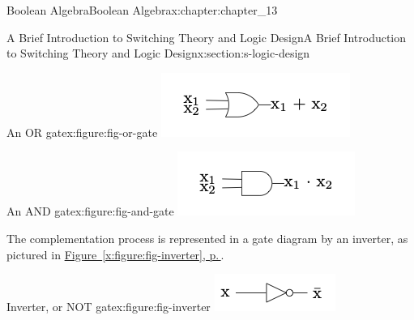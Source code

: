 \documentclass[twoside,10pt,]{book}
\newcommand{\xreffont}{\relax}
\numberwithin{equation}{section}
\begin{document}
\begin{chapterptx}{Boolean Algebra}{}{Boolean Algebra}{}{}{x:chapter:chapter_13}
\begin{sectionptx}{A Brief Introduction to Switching Theory and Logic Design}{}{A Brief Introduction to Switching Theory and Logic Design}{}{}{x:section:s-logic-design}
\begin{sidebyside}{2}{0}{0}{0}%
\begin{sbspanel}{0.5}%
\begin{figureptx}{An OR gate}{x:figure:fig-or-gate}{}%
\includegraphics[width=\linewidth]{images/fig-or-gate.png}
\tcblower
\end{figureptx}%
\end{sbspanel}%
\begin{sbspanel}{0.5}%
\begin{figureptx}{An AND gate}{x:figure:fig-and-gate}{}%
\includegraphics[width=\linewidth]{images/fig-and-gate.png}
\tcblower
\end{figureptx}%
\end{sbspanel}%
\end{sidebyside}%
\begin{sidebyside}{2}{0}{0}{0}%
\begin{sbspanel}{0.5}%
The complementation process is represented in a gate diagram by an inverter, as pictured in \hyperref[x:figure:fig-inverter]{Figure~{\xreffont\ref{x:figure:fig-inverter}}, p.\,\pageref{x:figure:fig-inverter}}.%
\end{sbspanel}%
\begin{sbspanel}{0.5}%
\begin{figureptx}{Inverter, or NOT gate}{x:figure:fig-inverter}{}%
\includegraphics[width=\linewidth]{images/fig-inverter.png}

\end{figureptx}
\end{sbspanel}
\end{sidebyside}
\end{sectionptx}
\end{chapterptx}
\end{document}
